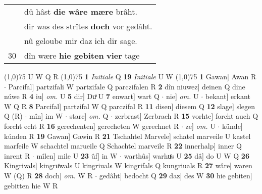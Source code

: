 \documentclass[8pt,a4paper,notitlepage]{article}
\begin{document}
\begin{table}[ht]
\begin{minipage}[t]{0.5\linewidth}
\begin{tabular}{rl}
 & dû hâst \textbf{die wâre mære} brâht.\\ 
 & dir was des strîtes \textbf{doch} vor gedâht.\\ 
 & nû geloube mir daz ich dir sage.\\ 
30 & dîn wære \textbf{hie gebiten} \textbf{vier} tage\\ 
\end{tabular}
\scriptsize
\line(1,0){75} \newline
U W Q R \newline
\line(1,0){75} \newline
\textbf{1} \textit{Initiale} Q  \textbf{19} \textit{Initiale} U W  \newline
\line(1,0){75} \newline
\textbf{1} Gawan] Awan R  $\cdot$ Parcifal] partzifali W partzifale Q parczifalen R \textbf{2} dîn niuwez] deinen Q dine núwe R \textbf{4} iu] \textit{om.} U \textbf{5} dir] Duͦ U \textbf{7} enwart] wart Q  $\cdot$ nie] \textit{om.} U  $\cdot$ bekant] erkant W Q R \textbf{8} Parcifal] partzifal W Q parczifal R \textbf{11} disen] diesem Q \textbf{12} slage] slegen Q (R)  $\cdot$ mîn] im W  $\cdot$ starc] \textit{om.} Q  $\cdot$ zerbrast] Zerbrach R \textbf{15} vorhte] forcht auch Q forcht echt R \textbf{16} gerechenten] gerecheten W gerechnet R  $\cdot$ ze] \textit{om.} U  $\cdot$ künde] kúnden R \textbf{19} Gawan] Gawin R \textbf{21} Tschahtel Marvele] schatel marveile U kastel marfeile W schachtel marueile Q Schachtel marveile R \textbf{22} innerhalp] inner Q inrent R  $\cdot$ mîlen] mile U \textbf{23} ûf] in W  $\cdot$ warthûs] warhuͦs U \textbf{25} dâ] do U W Q \textbf{26} Kingrivals] kingruͦwals U kingriuals W kingrifals Q kungriuals R \textbf{27} wâre] waren W (Q) R \textbf{28} doch] \textit{om.} W R  $\cdot$ gedâht] bedocht Q \textbf{29} daz] des W \textbf{30} hie gebiten] gebitten hie W R \newline
\end{minipage}
\end{table}
\end{document}

